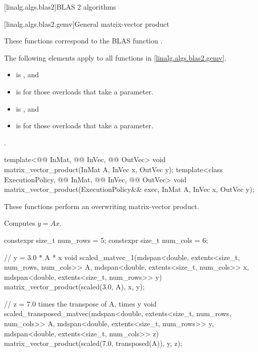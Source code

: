 [linalg.algs.blas2]{BLAS 2 algorithms}

[linalg.algs.blas2.gemv]{General matrix-vector product}

\pnum
\begin{note}
These functions correspond to the BLAS function .
\end{note}

\pnum
The following elements apply to all functions in \ref{linalg.algs.blas2.gemv}.

\pnum
\mandates
\begin{itemize}
\item
{}
is , and
\item
{}
is  for those overloads that take a  parameter.
\end{itemize}

\pnum
\expects
\begin{itemize}
\item
{} is , and
\item
{} is  for those overloads that take a  parameter.
\end{itemize}

\pnum
\complexity
{}.

\begin{itemdecl}
template<@@ InMat, @@ InVec, @@ OutVec>
  void matrix_vector_product(InMat A, InVec x, OutVec y);
template<class ExecutionPolicy, @@ InMat, @@ InVec, @@ OutVec>
  void matrix_vector_product(ExecutionPolicy&& exec, InMat A, InVec x, OutVec y);
\end{itemdecl}

\begin{itemdescr}
\pnum
These functions perform an overwriting matrix-vector product.

\pnum
\effects
Computes $y = A x$.
\end{itemdescr}

\begin{example}
\begin{codeblock}
constexpr size_t num_rows = 5;
constexpr size_t num_cols = 6;

// y = 3.0 * A * x
void scaled_matvec_1(mdspan<double, extents<size_t, num_rows, num_cols>> A,
  mdspan<double, extents<size_t, num_cols>> x, mdspan<double, extents<size_t, num_rows>> y) {
  matrix_vector_product(scaled(3.0, A), x, y);
}

// z = 7.0 times the transpose of A, times y
void scaled_transposed_matvec(mdspan<double, extents<size_t, num_rows, num_cols>> A,
  mdspan<double, extents<size_t, num_rows>> y, mdspan<double, extents<size_t, num_cols>> z) {
  matrix_vector_product(scaled(7.0, transposed(A)), y, z);
}
\end{codeblock}
\end{example}


